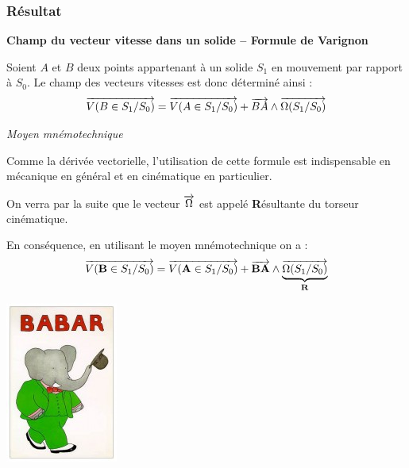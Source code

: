 \documentclass[10pt,oneside]{article}
\begin{document}
\subsubsection{Résultat}
\begin{resultat}
\textbf{Champ du vecteur vitesse dans un solide -- Formule de Varignon}

Soient $A$ et $B$ deux points appartenant à un solide $S_1$ en mouvement par rapport à $S_0$. Le champ des vecteurs vitesses est donc déterminé ainsi :
$$
\overrightarrow{V(B\in S_1/S_0)} = \overrightarrow{V(A\in S_1/S_0)} + \overrightarrow{BA}\wedge \overrightarrow{\Omega(S_1/S_0)}
$$
\end{resultat}

\begin{rem}

\textit{Moyen mnémotechnique}

\begin{minipage}[c]{.65\linewidth}
Comme la dérivée vectorielle, l'utilisation de cette formule est indispensable en mécanique en général et en cinématique en particulier.

On verra par la suite que le vecteur $\overrightarrow{\Omega}$ est appelé \textbf{R}ésultante du torseur cinématique. 

En conséquence, en utilisant le moyen mnémotechnique on a :
$$
\overrightarrow{V(\mathbf{B}\in S_1/S_0)} = \overrightarrow{V(\mathbf{A}\in S_1/S_0)} + \overrightarrow{\mathbf{BA}}\wedge \underbrace{\overrightarrow{\Omega(S_1/S_0)}}_{\mathbf{R}}
$$
\end{minipage}
\begin{minipage}[c]{.3\linewidth}
\begin{center}
\includegraphics[width=.6\textwidth]{png/babar}
\end{center}
\end{minipage}
\end{rem}
\end{document}
